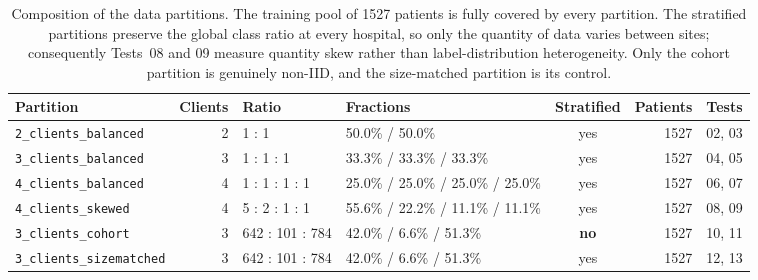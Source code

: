 \begin{table}[htbp]
  \centering
  \caption[Partition composition]{Composition of the data partitions. The training
    pool of 1527 patients is fully covered by every partition. The stratified
    partitions preserve the global class ratio at every hospital, so only the
    quantity of data varies between sites; consequently Tests~08 and 09 measure
    quantity skew rather than label-distribution heterogeneity. Only the cohort
    partition is genuinely non-IID, and the size-matched partition is its control.}
  \label{tab:partitions}
  \small
  \begin{tabular}{l r l l c r l}
    \toprule
    Partition & Clients & Ratio & Fractions & Stratified & Patients & Tests \\
    \midrule
    \texttt{2\_clients\_balanced} & 2 & 1 : 1 & 50.0\% / 50.0\% & yes & 1527 & 02, 03 \\
    \texttt{3\_clients\_balanced} & 3 & 1 : 1 : 1 & 33.3\% / 33.3\% / 33.3\% & yes & 1527 & 04, 05 \\
    \texttt{4\_clients\_balanced} & 4 & 1 : 1 : 1 : 1 & 25.0\% / 25.0\% / 25.0\% / 25.0\% & yes & 1527 & 06, 07 \\
    \texttt{4\_clients\_skewed} & 4 & 5 : 2 : 1 : 1 & 55.6\% / 22.2\% / 11.1\% / 11.1\% & yes & 1527 & 08, 09 \\
    \texttt{3\_clients\_cohort} & 3 & 642 : 101 : 784 & 42.0\% / 6.6\% / 51.3\% & \textbf{no} & 1527 & 10, 11 \\
    \texttt{3\_clients\_sizematched} & 3 & 642 : 101 : 784 & 42.0\% / 6.6\% / 51.3\% & yes & 1527 & 12, 13 \\
    \bottomrule
  \end{tabular}
\end{table}
